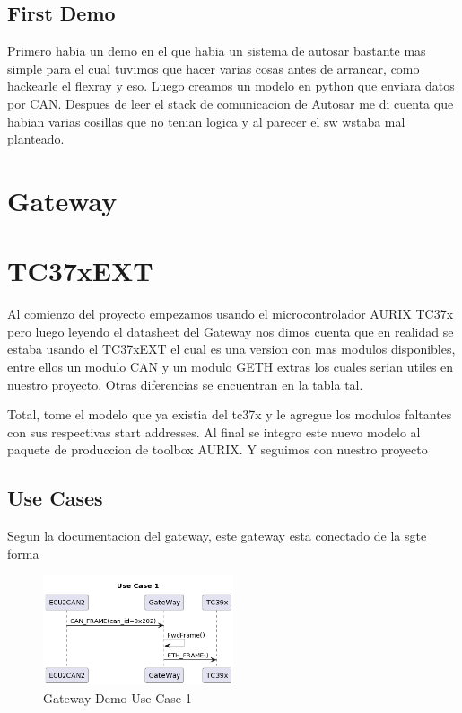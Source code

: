 \subsection{First Demo}
Primero habia un demo en el que habia un sistema de autosar bastante mas simple para el cual tuvimos que hacer varias cosas antes de arrancar, como hackearle el flexray y eso. Luego creamos un modelo en python que enviara datos por CAN. Despues de leer el stack de comunicacion de Autosar me di cuenta que habian varias cosillas que no tenian logica y al parecer el sw wstaba mal planteado. 
\section{Gateway}

\section{TC37xEXT}
Al comienzo del proyecto empezamos usando el microcontrolador AURIX TC37x \cite{aurix.tc37x} pero luego leyendo el datasheet del Gateway nos dimos cuenta que en realidad se estaba usando el TC37xEXT \cite{aurix.tc37e} el cual es una version con mas modulos disponibles, entre ellos un modulo CAN y un modulo GETH extras los cuales serian utiles en nuestro proyecto. Otras diferencias se encuentran en la tabla tal.



Total, tome el modelo que ya existia del tc37x y le agregue los modulos faltantes con sus respectivas start addresses. Al final se integro este nuevo modelo al paquete de produccion de toolbox AURIX. Y seguimos con nuestro proyecto

\subsection{Use Cases}
Segun la documentacion del gateway, este gateway esta conectado de la sgte forma

\begin{figure}[!htb]
 \centering
 \includegraphics[width=0.5\textwidth]{img/GWUseCase1.png}
 \caption{Gateway Demo Use Case 1}
 \label{fig:gw-demo-uc1}
\end{figure}

